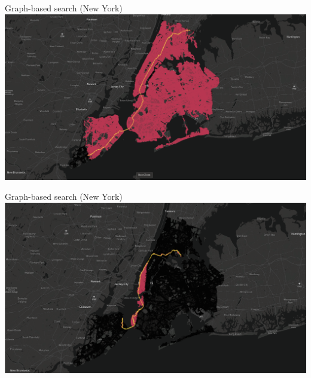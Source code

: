 \documentclass[aspectratio=169]{beamer}
\begin{document}
\begin{frame}[plain]{Graph-based search (New York)}
    \includegraphics[width=1.0\linewidth, keepaspectratio]{figures/ny_graph_based.png}
\end{frame}

\begin{frame}[plain]{Graph-based search (New York)}
    \includegraphics[width=1.0\linewidth, keepaspectratio]{figures/ny_graph_based_geodesic.png}
\end{frame}
\end{document}
